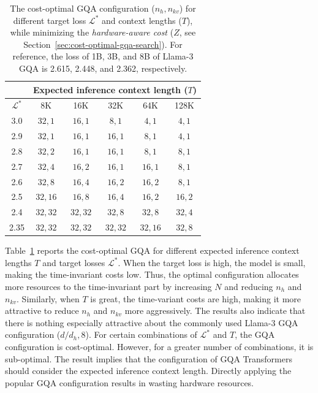 \documentclass[11pt]{article}
\begin{document}
\begin{table}[!t]
    \footnotesize
    \centering
    \begin{tabular}{c|c|c|c|c|c}
        \toprule
        & \multicolumn{5}{c}{\textbf{Expected inference context length ($T$)}}\\
        \midrule
        $\mathcal L^*$ & 8K & 16K & 32K & 64K & 128K \\
        \midrule
        3.0 & $32, 1$ & $16, 1$ & $8,1$  & $4,1$ & $4, 1$ \\
        2.9 & $32, 1$ & $16, 1$ & $16,1$ & $8,1$ & $4, 1$ \\
        2.8 & $32, 2$ & $16, 1$ & $16,1$ & $8,1$ & $8, 1$ \\
        2.7 & $32, 4$ & $16, 2$ & $16,1$ & $16,1$ & $8, 1$ \\
        2.6 & $32, 8$ & $16, 4$ & $16,2$ & $16,2$ & $8, 1$ \\
        2.5 & $32,16$ & $16, 8$ & $16,4$ & $16,2$ & $16, 2$ \\
        2.4 & $32,32$ & $32,32$ & $32,8$ & $32,8$ & $32, 4$ \\
        2.35 & $32,32$ & $32,32$ & $32,32$ & $32,16$ & $32, 8$ \\
        \bottomrule
    \end{tabular}
    \caption{The cost-optimal GQA configuration ($n_h, n_{kv}$) for different target loss $\mathcal L^*$ and context lengths ($T$), while minimizing the \textit{hardware-aware cost} ($Z$, see Section~\ref{sec:cost-optimal-gqa-search}). For reference, the loss of 1B, 3B, and 8B of Llama-3 GQA is 2.615, 2.448, and 2.362, respectively.}
    \label{tab:cost-optimal-gqa}
    \vspace{-1em}
\end{table}

Table~\ref{tab:cost-optimal-gqa} reports the cost-optimal GQA for different expected inference context lengths $T$ and target losses $\mathcal L^*$. When the target loss is high, the model is small, making the time-invariant costs low. Thus, the optimal configuration allocates more resources to the time-invariant part by increasing $N$ and reducing $n_h$ and $n_{kv}$. Similarly, when $T$ is great, the time-variant costs are high, making it more attractive to reduce $n_h$ and $n_{kv}$ more aggressively. The results also indicate that there is nothing especially attractive about the commonly used Llama-3 GQA configuration ($d/d_h, 8$). For certain combinations of $\mathcal L^*$ and $T$, the GQA configuration is cost-optimal. However, for a greater number of combinations, it is sub-optimal. The result implies that the configuration of GQA Transformers should consider the expected inference context length. Directly applying the popular GQA configuration results in wasting hardware resources.
\end{document}
